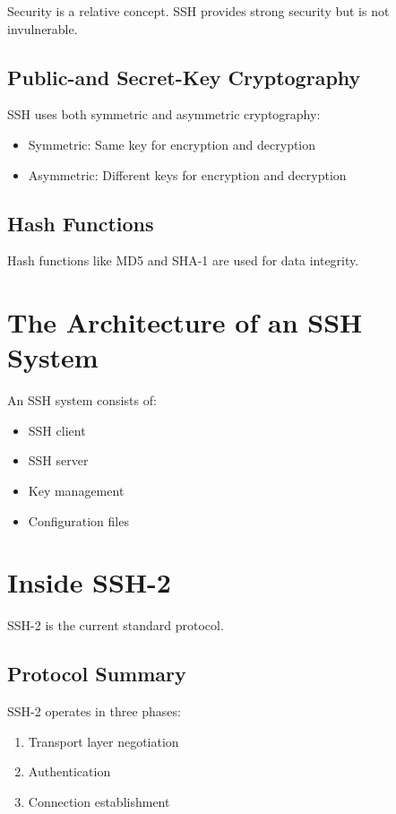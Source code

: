 \documentclass[12pt]{book}
\begin{document}
Security is a relative concept. SSH provides strong security but is not invulnerable.

\subsection{Public-and Secret-Key Cryptography}

SSH uses both symmetric and asymmetric cryptography:
\begin{itemize}
    \item Symmetric: Same key for encryption and decryption
    \item Asymmetric: Different keys for encryption and decryption
\end{itemize}

\subsection{Hash Functions}

Hash functions like MD5 and SHA-1 are used for data integrity.

\section{The Architecture of an SSH System}

An SSH system consists of:
\begin{itemize}
    \item SSH client
    \item SSH server
    \item Key management
    \item Configuration files
\end{itemize}

\section{Inside SSH-2}

SSH-2 is the current standard protocol.

\subsection{Protocol Summary}

SSH-2 operates in three phases:
\begin{enumerate}
    \item Transport layer negotiation
    \item Authentication
    \item Connection establishment
\end{enumerate}
\end{document}
